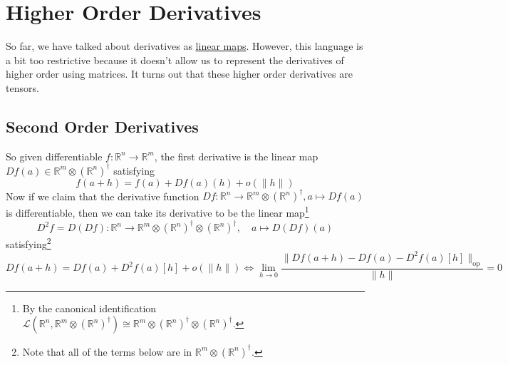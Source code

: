 \section{Higher Order Derivatives} 

  So far, we have talked about derivatives as \hyperref[lin-def:linear_map]{linear maps}. However, this language is a bit too restrictive because it doesn't allow us to represent the derivatives of higher order using matrices. It turns out that these higher order derivatives are tensors. 

\subsection{Second Order Derivatives}

	So given differentiable $f: \mathbb{R}^n \to \mathbb{R}^m$, the first derivative is the linear map $Df(a) \in \mathbb{R}^m \otimes (\mathbb{R}^n)^\dagger$ satisfying 
	\begin{equation}
	  f(a + h) = f(a) + Df(a) (h) + o(\|h\|)
	\end{equation} 
	Now if we claim that the derivative function $Df: \mathbb{R}^n \to \mathbb{R}^m \otimes (\mathbb{R}^n)^{\dagger}, a \mapsto Df(a)$ is differentiable, then we can take its derivative to be the linear map\footnote{By the canonical identification $\mathcal{L}(\mathbb{R}^n, \mathbb{R}^m \otimes (\mathbb{R}^n)^\dagger) \cong \mathbb{R}^m \otimes (\mathbb{R}^n)^\dagger \otimes (\mathbb{R}^n)^\dagger$. } 
	\begin{equation}
		D^2 f = D(Df): \mathbb{R}^n \to \mathbb{R}^m \otimes (\mathbb{R}^n)^\dagger \otimes (\mathbb{R}^n)^\dagger, \quad a \mapsto D(Df)(a)
	\end{equation}
	satisfying\footnote{Note that all of the terms below are in $\mathbb{R}^m \otimes (\mathbb{R}^n)^\dagger$.}
	\begin{equation}
		Df(a+h) = Df(a) + D^2 f(a) [h] + o(\|h\|) \iff \lim_{h \to 0} \frac{\|Df(a + h) - Df(a) - D^2 f(a) [h]\|_{\mathrm{op}}}{\|h\|} = 0
	\end{equation}

